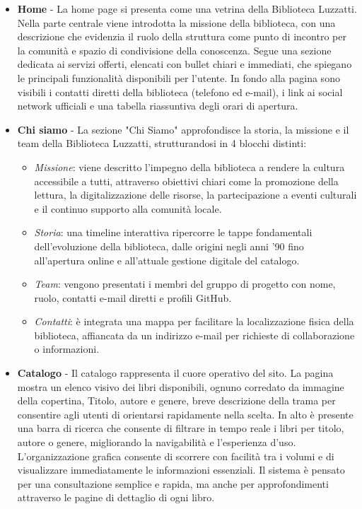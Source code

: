 \documentclass{article}
\begin{document}
\begin{itemize}
    \item \textbf{Home} - La home page si presenta come una vetrina della Biblioteca Luzzatti. Nella parte centrale viene introdotta la missione della biblioteca, con una descrizione che evidenzia il ruolo della struttura come punto di incontro per la comunità e spazio di condivisione della conoscenza. Segue una sezione dedicata ai servizi offerti, elencati con bullet chiari e immediati, che spiegano le principali funzionalità disponibili per l’utente. In fondo alla pagina sono visibili i contatti diretti della biblioteca (telefono ed e-mail), i link ai social network ufficiali e una tabella riassuntiva degli orari di apertura.
    
    \item \textbf{Chi siamo} - La sezione "Chi Siamo" approfondisce la storia, la missione e il team della Biblioteca Luzzatti, strutturandosi in 4 blocchi distinti:
        \begin{itemize}
            \item \emph{Missione}: viene descritto l'impegno della biblioteca a rendere la cultura accessibile a tutti, attraverso obiettivi chiari come la promozione della lettura, la digitalizzazione delle risorse, la partecipazione a eventi culturali e il continuo supporto alla comunità locale.
            \item \emph{Storia}: una timeline interattiva ripercorre le tappe fondamentali dell'evoluzione della biblioteca, dalle origini negli anni '90 fino all'apertura online e all'attuale gestione digitale del catalogo.
            \item \emph{Team}:  vengono presentati i membri del gruppo di progetto con nome, ruolo, contatti e-mail diretti e profili GitHub.
            \item \emph{Contatti}: è integrata una mappa per facilitare la localizzazione fisica della biblioteca, affiancata da un indirizzo e-mail per richieste di collaborazione o informazioni.
        \end{itemize}
          
    \item \textbf{Catalogo} - Il catalogo rappresenta il cuore operativo del sito. La pagina mostra un elenco visivo dei libri disponibili, ognuno corredato da immagine della copertina, Titolo, autore e genere, breve descrizione della trama per consentire agli utenti di orientarsi rapidamente nella scelta. In alto è presente una barra di ricerca che consente di filtrare in tempo reale i libri per titolo, autore o genere, migliorando la navigabilità e l'esperienza d'uso. L'organizzazione grafica consente di scorrere con facilità tra i volumi e di visualizzare immediatamente le informazioni essenziali. Il sistema è pensato per una consultazione semplice e rapida, ma anche per approfondimenti attraverso le pagine di dettaglio di ogni libro.
    

\end{itemize}
\end{document}
